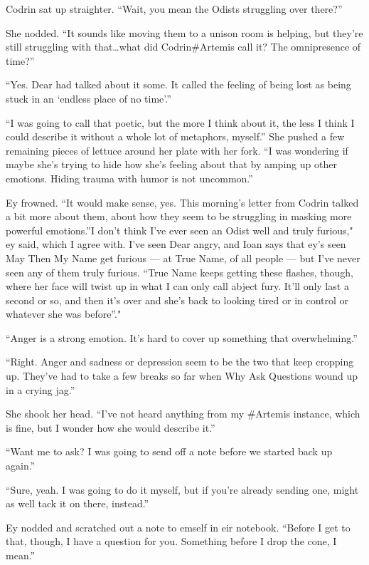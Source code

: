 Codrin sat up straighter. ``Wait, you mean the Odists struggling over there?''

She nodded. ``It sounds like moving them to a unison room is helping, but they're still struggling with that\ldots what did Codrin\#Artemis call it? The omnipresence of time?''

``Yes. Dear had talked about it some. It called the feeling of being lost as being stuck in an `endless place of no time'.''

``I was going to call that poetic, but the more I think about it, the less I think I could describe it without a whole lot of metaphors, myself.'' She pushed a few remaining pieces of lettuce around her plate with her fork. ``I was wondering if maybe she's trying to hide how she's feeling about that by amping up other emotions. Hiding trauma with humor is not uncommon.''

Ey frowned. ``It would make sense, yes. This morning's letter from Codrin talked a bit more about them, about how they seem to be struggling in masking more powerful emotions.''I don't think I've ever seen an Odist well and truly furious," ey said, which I agree with. I've seen Dear angry, and Ioan says that ey's seen May Then My Name get furious — at True Name, of all people — but I've never seen any of them truly furious. ``True Name keeps getting these flashes, though, where her face will twist up in what I can only call abject fury. It'll only last a second or so, and then it's over and she's back to looking tired or in control or whatever she was before''."

``Anger is a strong emotion. It's hard to cover up something that overwhelming.''

``Right. Anger and sadness or depression seem to be the two that keep cropping up. They've had to take a few breaks so far when Why Ask Questions wound up in a crying jag.''

She shook her head. ``I've not heard anything from my \#Artemis instance, which is fine, but I wonder how she would describe it.''

``Want me to ask? I was going to send off a note before we started back up again.''

``Sure, yeah. I was going to do it myself, but if you're already sending one, might as well tack it on there, instead.''

Ey nodded and scratched out a note to emself in eir notebook. ``Before I get to that, though, I have a question for you. Something before I drop the cone, I mean.''


